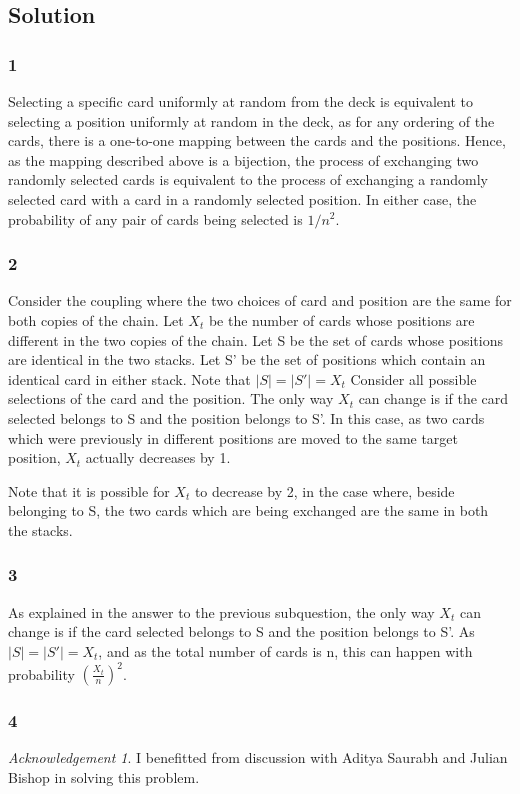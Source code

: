 \documentclass[10pt]{amsart}
\theoremstyle{remark}
\newtheorem*{ack}{Acknowledgement}
\begin{document}
\subsection{Solution}

\subsubsection{1} Selecting a specific card uniformly at random from the deck is equivalent to selecting a position uniformly at random in the deck, as for any ordering of the cards, there is a one-to-one mapping between the cards and the positions. Hence, as the mapping described above is a bijection, the process of exchanging two randomly selected cards is equivalent to the process of exchanging a randomly selected card with a card in a randomly selected position. In either case, the probability of any pair of cards being selected is $1/n^{2}$.

\subsubsection{2} Consider the coupling where the two choices of card and position are the same for both copies of the chain. Let $X_{t}$ be the number of cards whose positions are different in the two copies of the chain. Let S be the set of cards whose positions are identical in the two stacks. Let S' be the set of positions which contain an identical card in either stack. Note that $|S|=|S'|=X_{t}$ Consider all possible selections of the card and the position. The only way $X_{t}$ can change is if the card selected belongs to S and the position belongs to S'. In this case, as two cards which were previously in different positions are moved to the same target position, $X_{t}$ actually decreases by 1.

Note that it is possible for $X_{t}$ to decrease by 2, in the case where, beside belonging to S, the two cards which are being exchanged are the same in both the stacks.

\subsubsection{3} As explained in the answer to the previous subquestion, the only way $X_{t}$ can change is if the card selected belongs to S and the position belongs to S'. As $|S|=|S'|=X_{t}$, and as the total number of cards is n, this can happen with probability $(\frac{X_{t}}{n})^{2}$.

\subsubsection{4} 
\begin{ack}
I benefitted from discussion with Aditya Saurabh and Julian Bishop in solving this problem.
\end{ack}
\end{document}
